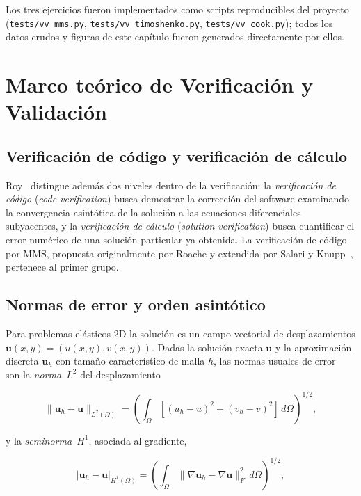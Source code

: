 Los tres ejercicios fueron implementados como scripts reproducibles del
proyecto (\verb|tests/vv_mms.py|, \verb|tests/vv_timoshenko.py|,
\verb|tests/vv_cook.py|); todos los datos crudos y figuras de este capítulo
fueron generados directamente por ellos.

\section{Marco teórico de Verificación y Validación}

\subsection{Verificación de código y verificación de cálculo}

Roy~\cite{roy2005review} distingue además dos niveles dentro de la
verificación: la \emph{verificación de código} (\emph{code verification})
busca demostrar la corrección del software examinando la convergencia
asintótica de la solución a las ecuaciones diferenciales subyacentes, y la
\emph{verificación de cálculo} (\emph{solution verification}) busca cuantificar
el error numérico de una solución particular ya obtenida. La verificación de
código por MMS, propuesta originalmente por Roache y extendida por Salari y
Knupp~\cite{salari2000mms}, pertenece al primer grupo.

\subsection{Normas de error y orden asintótico}

Para problemas elásticos 2D la solución es un campo vectorial de
desplazamientos $\mathbf{u}(x,y) = (u(x,y), v(x,y))$. Dadas la solución
exacta $\mathbf{u}$ y la aproximación discreta $\mathbf{u}_h$ con tamaño
característico de malla $h$, las normas usuales de
error~\cite{babuska2001finite,hughes2000finite} son la
\emph{norma~$L^2$} del desplazamiento

\begin{equation}
  \|\mathbf{u}_h - \mathbf{u}\|_{L^2(\Omega)} =
  \left( \int_{\Omega}
    \left[(u_h - u)^2 + (v_h - v)^2\right] \, d\Omega
  \right)^{1/2},
  \label{eq:L2}
\end{equation}

\noindent y la \emph{seminorma~$H^1$}, asociada al gradiente,

\begin{equation}
  |\mathbf{u}_h - \mathbf{u}|_{H^1(\Omega)} =
  \left( \int_{\Omega}
    \|\nabla \mathbf{u}_h - \nabla \mathbf{u}\|_F^2 \, d\Omega
  \right)^{1/2},
  \label{eq:H1}
\end{equation}

